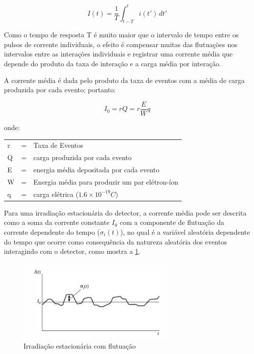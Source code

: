 \documentclass[11pt,a4paper]{article}
\begin{document}
				\begin{equation}
					I(t) = \frac{1}{T} \int_{t-T}^{t} i (t') \,dt' 
				\end{equation}

			\noindent Como o tempo de resposta T é muito maior que o intervalo de tempo entre os pulsos de corrente individuais, o efeito é compensar muitas das flutuações nos intervalos entre as interações individuais e registrar uma corrente média que depende do produto da taxa de interação e a carga média por interação.

			A corrente média é dada pelo produto da taxa de eventos com a média de carga produzida por cada evento; portanto:

				\begin{equation}
					I_0 = rQ = r\frac{E}{W}q
				\end{equation}
			
			\noindent onde:

				\begin{tabular}{l l l }
				r & = & Taxa de Eventos \\
				Q & = & carga produzida por cada evento \\
				E & = & energia média depositada por cada evento \\
				W & = & Energia média para produzir um par elétron-íon \\
				q & = & carga elétrica ($1.6 \times 10^{-19}C$)
				\end{tabular}

			Para uma irradiação estacionária do detector, a corrente média pode ser descrita como a soma da corrente constante $I_0$ com a componente de flutuação da corrente dependente do tempo ($\sigma_i(t)$), no qual é a variável aleatória dependente do tempo que ocorre como consequência da natureza aleatória dos eventos interagindo com o detector,  como mostra a  \ref{fig:esquemaCorrenteFlutuacao}.

			\begin{figure}[h]
				\centering
				\includegraphics[width=0.7\textwidth]{Imagens/esquemaCorrenteFlutuação.jpg}
				\caption{Irradiação estacionária com flutuação}
				\label{fig:esquemaCorrenteFlutuacao}
			\end{figure}
\end{document}
